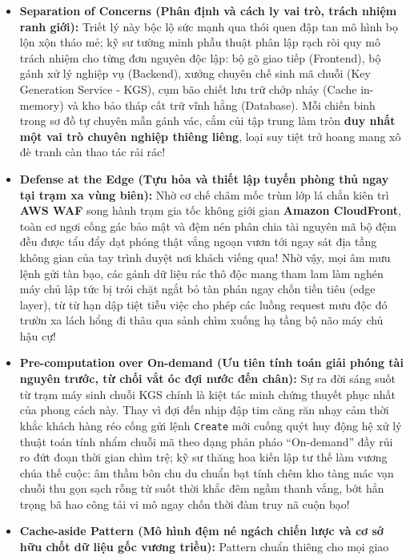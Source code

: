 \begin{itemize}
\tightlist
\item
  \textbf{Separation of Concerns (Phân định và cách ly vai trò, trách
  nhiệm ranh giới):} Triết lý này bộc lộ sức mạnh qua thói quen đập tan
  mô hình bọ lộn xộn tháo mẻ; kỹ sư tường minh phẫu thuật phân lập rạch
  ròi quy mô trách nhiệm cho từng đơn nguyên độc lập: bộ gõ giao tiếp
  (Frontend), bộ gánh xử lý nghiệp vụ (Backend), xưởng chuyên chế sinh
  mã chuỗi (Key Generation Service - KGS), cụm bão chiết lưu trữ chớp
  nháy (Cache in-memory) và kho bảo tháp cất trữ vĩnh hằng (Database).
  Mỗi chiến binh trong sơ đồ tự chuyên mẫn gánh vác, cắm củi tập trung
  làm tròn \textbf{duy nhất một vai trò chuyên nghiệp thiêng liêng},
  loại suy tiệt trở hoang mang xô đè tranh càn thao tác rải rác!
\item
  \textbf{Defense at the Edge (Tựu hỏa và thiết lập tuyến phòng thủ ngay
  tại trạm xa vùng biên):} Nhờ cơ chế châm mốc trùm lớp lá chắn kiên trì
  \textbf{AWS WAF} song hành trạm gia tốc không giới gian \textbf{Amazon
  CloudFront}, toàn cơ ngơi cống gác bảo mật và đệm nén phân chia tài
  nguyên mã bộ đệm đều được tẩu đẩy dạt phóng thật vắng ngoạn vươn tới
  ngay sát địa tầng không gian của tay trình duyệt nơi khách viếng qua!
  Nhờ vậy, mọi âm mưu lệnh gửi tàn bạo, các gánh dữ liệu rác thô độc
  mang tham lam làm nghén máy chủ lập tức bị trói chặt ngắt bỏ tàn phán
  ngay chốn tiền tiêu (edge layer), từ từ hạn dập tiệt tiễu việc cho
  phép các luồng request mưu độc đó trườn xa lách hổng đi thâu qua sảnh
  chìm xuống hạ tầng bộ não máy chủ hậu cự!
\item
  \textbf{Pre-computation over On-demand (Ưu tiên tính toán giải phóng
  tài nguyên trước, từ chối vắt óc đợi nước đến chân):} Sự ra đời sáng
  suốt từ trạm máy sinh chuỗi KGS chính là kiệt tác minh chứng thuyết
  phục nhất của phong cách này. Thay vì đợi đến nhịp đập tim căng răn
  nhạy cảm thời khắc khách hàng réo cống gửi lệnh \texttt{Create} mới
  cuống quýt huy động hệ xử lý thuật toán tính nhẩm chuỗi mã theo dạng
  phản pháo ``On-demand'' đầy rủi ro đứt đoạn thời gian chìm trệ; kỹ sư
  thăng hoa kiến lập tư thế làm vương chúa thế cuộc: âm thầm bôn chu du
  chuẩn bạt tính chêm kho tàng mác vạn chuỗi thu gọn sạch rỗng từ suốt
  thời khắc đêm ngầm thanh vắng, bớt hẳn trọng bã hao công tải vi mô
  ngay chốn thời đàm truy nã cuộn bạo!
\item
  \textbf{Cache-aside Pattern (Mô hình đệm né ngách chiến lược và cơ sở
  hữu chốt dữ liệu gốc vương triều):} Pattern chuẩn thiêng cho mọi giao

\end{itemize}
